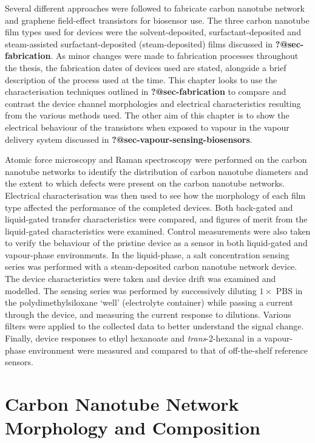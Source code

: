 \documentclass[
  a4paper,
]{scrbook}
\begin{document}
Several different approaches were followed to fabricate carbon nanotube
network and graphene field-effect transistors for biosensor use. The
three carbon nanotube film types used for devices were the
solvent-deposited, surfactant-deposited and steam-assisted
surfactant-deposited (steam-deposited) films discussed in
\textbf{?@sec-fabrication}. As minor changes were made to fabrication
processes throughout the thesis, the fabrication dates of devices used
are stated, alongside a brief description of the process used at the
time. This chapter looks to use the characterisation techniques outlined
in \textbf{?@sec-fabrication} to compare and contrast the device channel
morphologies and electrical characteristics resulting from the various
methods used. The other aim of this chapter is to show the electrical
behaviour of the transistors when exposed to vapour in the vapour
delivery system discussed in \textbf{?@sec-vapour-sensing-biosensors}.

Atomic force microscopy and Raman spectroscopy were performed on the
carbon nanotube networks to identify the distribution of carbon nanotube
diameters and the extent to which defects were present on the carbon
nanotube networks. Electrical characterisation was then used to see how
the morphology of each film type affected the performance of the
completed devices. Both back-gated and liquid-gated transfer
characteristics were compared, and figures of merit from the
liquid-gated characteristics were examined. Control measurements were
also taken to verify the behaviour of the pristine device as a sensor in
both liquid-gated and vapour-phase environments. In the liquid-phase, a
salt concentration sensing series was performed with a steam-deposited
carbon nanotube network device. The device characteristics were taken
and device drift was examined and modelled. The sensing series was
performed by successively diluting \(1 \times\) PBS in the
polydimethylsiloxane `well' (electrolyte container) while passing a
current through the device, and measuring the current response to
dilutions. Various filters were applied to the collected data to better
understand the signal change. Finally, device responses to ethyl
hexanoate and \emph{trans}-2-hexanal in a vapour-phase environment were
measured and compared to that of off-the-shelf reference sensors.

\hypertarget{sec-pristine-morphology}{%
\section{Carbon Nanotube Network Morphology and
Composition}\label{sec-pristine-morphology}}
\end{document}
